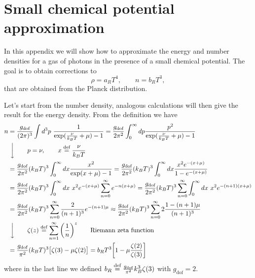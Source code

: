 \section{Small chemical potential approximation}
\label{sec:SmallChemicalPotential}
In this appendix we will show how to approximate the energy and number densities for a gas of photons in the presence of a small chemical potential.
The goal is to obtain corrections to  
$$\rho=a_RT^4,\qquad n=b_RT^3,$$ that are obtained from the Planck distribution.

Let's start from the number density, analogous calculations will then give the result for the energy density. From the definition we have
\begin{align}
    n&=\frac{g_\text{dof}}{(2\pi)^3}\int d^3p\ \frac{1}{\exp(\frac{\nu}{k_BT}+\mu)-1}=\frac{g_\text{dof}}{2\pi^2}\int_0^\infty dp \frac{p^2 }{\exp(\frac{\nu}{k_BT}+\mu)-1}\nonumber\\&\ \bigg\downarrow\qquad p=\nu,\qquad x\defeq\frac{\nu}{k_BT}\nonumber\\
    &=\frac{g_\text{dof}}{2\pi^2}(k_BT)^3\int_0^\infty dx \frac{x^2}{\exp(x+\mu)-1}=\frac{g_\text{dof}}{2\pi^2}(k_BT)^3\int_0^\infty dx \frac{x^2e^{-(x+\mu)}}{1-e^{-(x+\mu)}}\nonumber\\&=\frac{g_\text{dof}}{2\pi^2}(k_BT)^3\int_0^\infty dx\ x^2e^{-(x+\mu)}\sum_{n=0}^{\infty}e^{-n(x+\mu)}=\frac{g_\text{dof}}{2\pi^2}(k_BT)^3\sum_{n=0}^{\infty}\int_0^\infty dx\ x^2e^{-(n+1)(x+\mu)}\nonumber\\&=\frac{g_\text{dof}}{2\pi^2}(k_BT)^3\sum_{n=0}^{\infty}\frac{2}{(n+1)^3}e^{-(n+1)\mu}\approx\frac{g_\text{dof}}{2\pi^2}(k_BT)^3\sum_{n=0}^{\infty}2\frac{1-(n+1)\mu}{(n+1)^3}\nonumber\\&\ \bigg \downarrow\qquad \zeta(z)\defeq\sum_{n=1}^\infty\bigg(\frac{1}{n}\bigg)^z\qquad\text{Riemann zeta function}\nonumber\\
    &=\frac{g_\text{dof}}{\pi^2}(k_BT)^3\big[\zeta(3)-\mu\zeta(2)\big]=b_RT^3\bigg[1-\mu\frac{\zeta(2)}{\zeta(3)}\bigg]\,\label{eq:SmallChemicalPotential_n}
\end{align}
where in the last line we defined $b_R\stackrel{\text{def}}{=}\frac{g_\text{dof}}{\pi^2}k_B^3\zeta(3)$ with $g_\text{dof}=2$.

